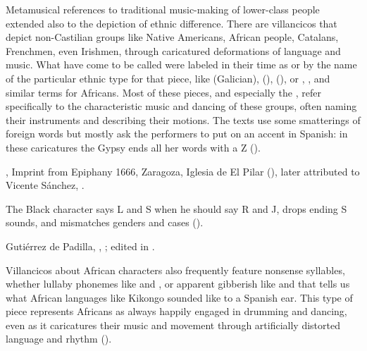 Metamusical references to traditional music-making of lower-class people
extended also to the depiction of ethnic difference.
There are villancicos that depict non-Castilian groups like Native Americans,
African people, Catalans, Frenchmen, even Irishmen, through caricatured
deformations of language and music.%
    \Autocites
    {Baker:EthnicVC}
    {Baker:PerformancePostColonial}
    {Davies:LocalContent}
    {AlvesSimao:VillancicosDeNegros}
    {Molinero:Negros}
    {Santamaria:Negrillas}
    {Goldberg:SonidosNegros}
What have come to be called  were labeled in their
time as  or by the name of the particular ethnic
type for that piece, like  (Galician), 
(),  (), or ,
, and similar terms for Africans.
Most of these pieces, and especially the , refer
specifically to the characteristic music and dancing of these groups, often
naming their instruments and describing their motions.
The texts use some smatterings of foreign words but mostly ask the performers
to put on an accent in Spanish: in these caricatures the Gypsy ends all her
words with a Z ().%
\begin{Footnote}
    , Imprint from Epiphany 1666, Zaragoza,
    Iglesia de El Pilar (), later attributed to Vicente
    Sánchez, .
\end{Footnote}
The Black character says L and S when he should say R and J, drops ending S
sounds, and mismatches genders and cases ().%
\begin{Footnote}
    Gutiérrez de Padilla, ,
    ; edited in \autocite{Cashner:WLSCM32}.
\end{Footnote}
Villancicos about African characters also frequently feature nonsense
syllables, whether lullaby phonemes like  and , or apparent gibberish like  and
 that tells us what African languages like Kikongo
sounded like to a Spanish ear.%
    \Autocite{Lipski:AfroHispanic}
This type of piece represents Africans as always happily engaged in drumming
and dancing, even as it caricatures their music and movement through
artificially distorted language and rhythm
().

